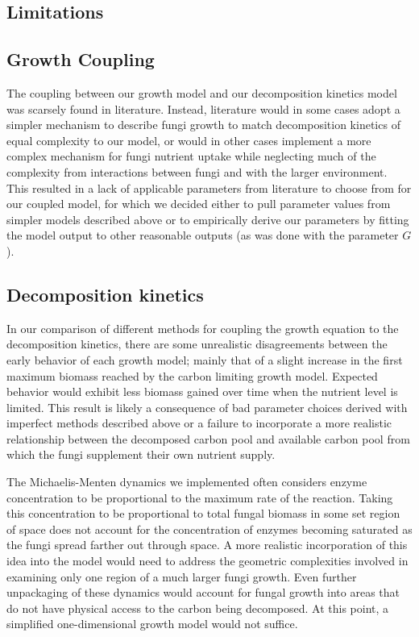 \documentclass[12pt]{article}
\begin{document}
\begin{multicols}{2}

\section{Limitations}
\vspace*{-2ex}
\subsection{Growth Coupling}
The coupling between our growth model and our decomposition kinetics model was scarsely found in literature. Instead, literature would in some cases adopt a simpler mechanism to describe fungi growth to match decomposition kinetics of equal complexity to our model, or would in other cases implement a more complex mechanism for fungi nutrient uptake while neglecting much of the complexity from interactions between fungi and with the larger environment. This resulted in a lack of applicable parameters from literature to choose from for our coupled model, for which we decided either to pull parameter values from simpler models described above or to empirically derive our parameters by fitting the model output to other reasonable outputs (as was done with the parameter $G$). 

\subsection{Decomposition kinetics}
In our comparison of different methods for coupling the growth equation to the decomposition kinetics, there are some unrealistic disagreements between the early behavior of each growth model; mainly that of a slight increase in the first maximum biomass reached by the carbon limiting growth model. Expected behavior would exhibit less biomass gained over time when the nutrient level is limited. This result is likely a consequence of bad parameter choices derived with imperfect methods described above or a failure to incorporate a more realistic relationship between the decomposed carbon pool and available carbon pool from which the fungi supplement their own nutrient supply.

The Michaelis-Menten dynamics we implemented often considers enzyme concentration to be proportional to the maximum rate of the reaction. Taking this concentration to be proportional to total fungal biomass in some set region of space does not account for the concentration of enzymes becoming saturated as the fungi spread farther out through space. A more realistic incorporation of this idea into the model would need to address the geometric complexities involved in examining only one region of a much larger fungi growth. Even further unpackaging of these dynamics would account for fungal growth into areas that do not have physical access to the carbon being decomposed. At this point, a simplified one-dimensional growth model would not suffice.


\end{multicols}
\end{document}
